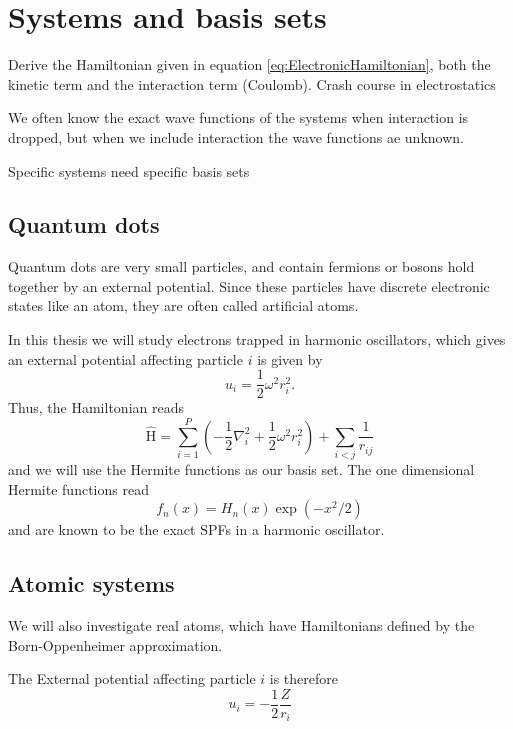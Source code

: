 \chapter{Systems and basis sets} \label{chp:potentials}
Derive the Hamiltonian given in equation \eqref{eq:ElectronicHamiltonian}, both the kinetic term and the interaction term (Coulomb). Crash course in electrostatics 

We often know the exact wave functions of the systems when interaction is dropped, but when we include interaction the wave functions ae unknown. 

Specific systems need specific basis sets

\section{Quantum dots} \label{subsubsec:quantumdots}
Quantum dots are very small particles, and contain fermions or bosons hold together by an external potential. Since these particles have discrete electronic states like an atom, they are often called artificial atoms. 

In this thesis we will study electrons trapped in harmonic oscillators, which gives an external potential affecting particle $i$ is given by
\begin{equation}
u_i=\frac{1}{2}\omega^2r_i^2.
\end{equation}
Thus, the Hamiltonian reads
\begin{equation}
\label{eq:HOHamiltonian}
\hat{\text{H}} = \sum_{i=1}^{P} (-\frac{1}{2} \nabla_i^2 + \frac{1}{2} \omega^2 r_i ^2) + \sum_{i<j} \frac{1}{r_{ij}} 
\end{equation}
and we will use the Hermite functions as our basis set. The one dimensional Hermite functions read
\begin{equation}
f_n(x)=H_n(x)\exp(-x^2/2)
\end{equation}
and are known to be the exact SPFs in a harmonic oscillator. 

\section{Atomic systems} \label{subsubsec:atomic}
We will also investigate real atoms, which have Hamiltonians defined by the Born-Oppenheimer approximation.

The External potential affecting particle $i$ is therefore
\begin{equation}
u_i=- \frac{1}{2} \frac{Z}{r_i}
\end{equation}


